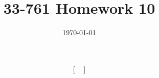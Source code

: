\documentclass[a4paper,twoside]{article}
\title{33-761 Homework 10}
\date{\today}
\begin{document}
\maketitle

\begin{equation}
    \begin{bmatrix}
    
    \end{bmatrix}

\end{equation}
\end{document}

